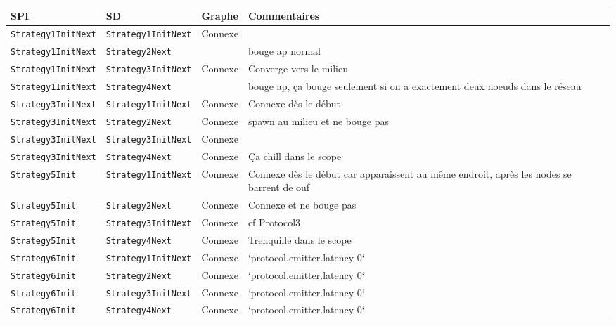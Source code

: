\documentclass[a4paper]{article}
\begin{document}
\begin{minipage}[c]{\textwidth}
\begin{tabularx}{\textwidth}{| l | l | l | X |}
  \hline
  \textbf{SPI} & \textbf{SD} & \textbf{Graphe} & \textbf{Commentaires}\\
  \hline
  \texttt{Strategy1InitNext} & \texttt{Strategy1InitNext} & Connexe &\\
  \hline
  \texttt{Strategy1InitNext} & \texttt{Strategy2Next} &  & bouge ap normal\\
  \hline
  \texttt{Strategy1InitNext} & \texttt{Strategy3InitNext} & Connexe & Converge vers le milieu\\
  \hline
  \texttt{Strategy1InitNext} & \texttt{Strategy4Next} & & bouge ap, ça
  bouge seulement si on a
  exactement deux noeuds dans le réseau\\
  \hline
  \texttt{Strategy3InitNext} & \texttt{Strategy1InitNext} & Connexe & Connexe dès le début\\
  \hline
  \texttt{Strategy3InitNext} & \texttt{Strategy2Next} & Connexe & spawn au milieu et ne bouge pas\\
  \hline
  \texttt{Strategy3InitNext} & \texttt{Strategy3InitNext} & Connexe\\
  \hline
  \texttt{Strategy3InitNext} & \texttt{Strategy4Next} & Connexe & Ça chill dans le scope\\
  \hline
  \texttt{Strategy5Init} & \texttt{Strategy1InitNext} & Connexe& Connexe dès le début car apparaissent au même endroit, après les nodes se barrent de ouf\\
  \hline
  \texttt{Strategy5Init} & \texttt{Strategy2Next} & Connexe & Connexe et ne bouge pas\\
  \hline
  \texttt{Strategy5Init} & \texttt{Strategy3InitNext} & Connexe & cf Protocol3\\
  \hline
  \texttt{Strategy5Init} & \texttt{Strategy4Next} & Connexe & Trenquille dans le scope\\
  \hline
  \texttt{Strategy6Init} & \texttt{Strategy1InitNext} & Connexe& `protocol.emitter.latency 0`\\
  \hline
  \texttt{Strategy6Init} & \texttt{Strategy2Next} & Connexe & `protocol.emitter.latency 0`\\
  \hline
  \texttt{Strategy6Init} & \texttt{Strategy3InitNext} & Connexe & `protocol.emitter.latency 0`\\
  \hline
  \texttt{Strategy6Init} & \texttt{Strategy4Next} & Connexe & `protocol.emitter.latency 0`\\
  \hline
\end{tabularx}
\end{minipage}
\end{document}
